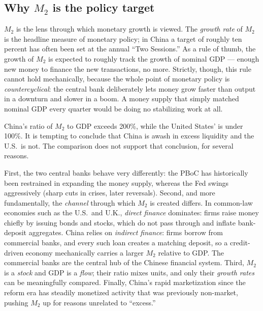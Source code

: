 \subsection{Why \texorpdfstring{$M_2$}{M2} is the policy target}

$M_2$ is the lens through which monetary growth is viewed. The \emph{growth rate} of $M_2$ is the headline measure of monetary policy; in China a target of roughly ten percent has often been set at the annual ``Two Sessions.'' As a rule of thumb, the growth of $M_2$ is expected to roughly track the growth of nominal GDP --- enough new money to finance the new transactions, no more. Strictly, though, this rule cannot hold mechanically, because the whole point of monetary policy is \emph{countercyclical}: the central bank deliberately lets money grow faster than output in a downturn and slower in a boom. A money supply that simply matched nominal GDP every quarter would be doing no stabilizing work at all.

\begin{remark}
China's ratio of $M_2$ to GDP exceeds 200\%, while the United States' is under 100\%. It is tempting to conclude that China is awash in excess liquidity and the U.S.\ is not. The comparison does not support that conclusion, for several reasons.

First, the two central banks behave very differently: the PBoC has historically been restrained in expanding the money supply, whereas the Fed swings aggressively (sharp cuts in crises, later reversals). Second, and more fundamentally, the \emph{channel} through which $M_2$ is created differs. In common-law economies such as the U.S.\ and U.K., \emph{direct finance} dominates: firms raise money chiefly by issuing bonds and stocks, which do not pass through and inflate bank-deposit aggregates. China relies on \emph{indirect finance}: firms borrow from commercial banks, and every such loan creates a matching deposit, so a credit-driven economy mechanically carries a larger $M_2$ relative to GDP. The commercial banks are the central hub of the Chinese financial system. Third, $M_2$ is a \emph{stock} and GDP is a \emph{flow}; their ratio mixes units, and only their \emph{growth rates} can be meaningfully compared. Finally, China's rapid marketization since the reform era has steadily monetized activity that was previously non-market, pushing $M_2$ up for reasons unrelated to ``excess.''
\end{remark}

